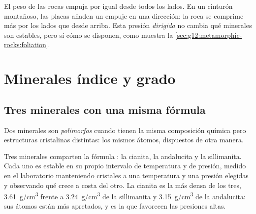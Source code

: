 El peso de las rocas empuja por igual desde todos los lados. En un cinturón
montañoso, las placas añaden un empuje en una dirección: la roca se comprime
más por los lados que desde arriba. Esta presión \emph{dirigida} no cambia
qué minerales son estables, pero sí cómo se disponen, como muestra la
\cref{sec:g12:metamorphic-rocks:foliation}.

\section{Minerales índice y grado}

\subsection{Tres minerales con una misma fórmula}

\begin{definition}[Polimorfo]\label{def:g12:metamorphic-rocks:polymorph}
Dos minerales son \emph{polimorfos} cuando tienen la misma
composición química pero estructuras cristalinas distintas: los mismos
átomos, dispuestos de otra manera.
\end{definition}

Tres minerales comparten la fórmula : la cianita, la andalucita y
la sillimanita. Cada uno es estable en su propio intervalo de temperatura y
de presión, medido en el laboratorio manteniendo cristales a una temperatura y
una presión elegidas y observando qué  crece a costa del otro. La
cianita es la más densa de los tres,
\qty{3.61}{g/cm^3} frente a \qty{3.24}{g/cm^3} de la sillimanita y
\qty{3.15}{g/cm^3} de la andalucita: sus átomos están más apretados, y es la
que favorecen las presiones altas.

